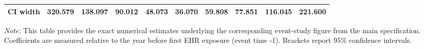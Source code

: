 \begin{landscape}
\begin{table}[!h]
\begin{tabular}[t]{lccccccccc}
\hspace{1em}CI width & 320.579 & 138.097 & 90.012 & 48.073 & 36.070 & 59.808 & 77.851 & 116.045 & 221.600\\
\bottomrule
\end{tabular}
\begin{tablenotes}
\item \textit{Note: } This table provides the exact numerical estimates underlying the corresponding event-study figure from the main specification. Coefficients are measured relative to the year before first EHR exposure (event time -1). Brackets report 95\% confidence intervals. 
\end{tablenotes}
\end{table}
\end{landscape}
